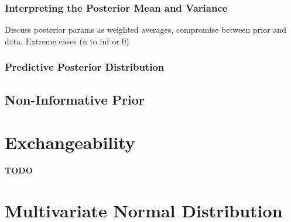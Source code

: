 \documentclass[12pt]{article}
\begin{document}
\subsubsection{Interpreting the Posterior Mean and Variance}
Discuss posterior params as weighted averages, compromise between prior and data. Extreme cases (n to inf or 0)

\subsubsection{Predictive Posterior Distribution}

\subsection{Non-Informative Prior}


\section{Exchangeability}
\textbf{TODO}



\section{Multivariate Normal Distribution}
\end{document}
